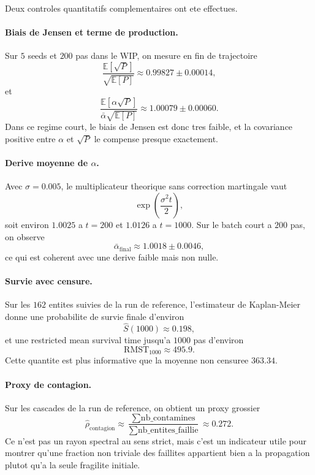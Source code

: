 \documentclass[11pt,a4paper]{article}
\begin{document}
Deux controles quantitatifs complementaires ont ete effectues.

\paragraph{Biais de Jensen et terme de production.}
Sur $5$ seeds et $200$ pas dans le WIP, on mesure en fin de trajectoire
\[
\frac{\mathbb E[\sqrt P]}{\sqrt{\mathbb E[P]}} \approx 0.99827 \pm 0.00014,
\]
et
\[
\frac{\mathbb E[\alpha\sqrt P]}{\bar\alpha\sqrt{\mathbb E[P]}}
\approx
1.00079 \pm 0.00060.
\]
Dans ce regime court, le biais de Jensen est donc tres faible, et la covariance positive entre $\alpha$ et $\sqrt P$ le compense presque exactement.

\paragraph{Derive moyenne de $\alpha$.}
Avec $\sigma=0.005$, le multiplicateur theorique sans correction martingale vaut
\[
\exp\!\left(\frac{\sigma^2 t}{2}\right),
\]
soit environ $1.0025$ a $t=200$ et $1.0126$ a $t=1000$. Sur le batch court a $200$ pas, on observe
\[
\bar\alpha_{\mathrm{final}} \approx 1.0018 \pm 0.0046,
\]
ce qui est coherent avec une derive faible mais non nulle.

\paragraph{Survie avec censure.}
Sur les $162$ entites suivies de la run de reference, l'estimateur de Kaplan-Meier donne une probabilite de survie finale d'environ
\[
\hat S(1000)\approx 0.198,
\]
et une restricted mean survival time jusqu'a $1000$ pas d'environ
\[
\mathrm{RMST}_{1000}\approx 495.9.
\]
Cette quantite est plus informative que la moyenne non censuree $363.34$.

\paragraph{Proxy de contagion.}
Sur les cascades de la run de reference, on obtient un proxy grossier
\[
\widehat \rho_{\mathrm{contagion}}
\approx
\frac{\sum \text{nb\_contamines}}{\sum \text{nb\_entites\_faillie}}
\approx 0.272.
\]
Ce n'est pas un rayon spectral au sens strict, mais c'est un indicateur utile pour montrer qu'une fraction non triviale des faillites appartient bien a la propagation plutot qu'a la seule fragilite initiale.
\end{document}
